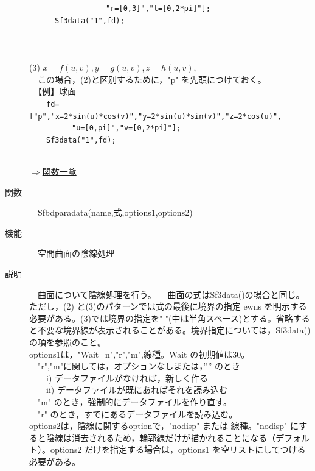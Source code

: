 \documentclass[papersize,a4paper,12pt,uplatex]{jsarticle}
\begin{document}
\begin{description}
　　　　　　　　　\verb|"r=[0,3]","t=[0,2*pi]"];|\\
　　　\verb|Sf3data("1",fd);|\\
\\
　　　\\
\\
(3) $x=f(u,v),y=g(u,v),z=h(u,v),$\\
　この場合，(2)と区別するために，"p" を先頭につけておく。\\
　【例】球面\\
　　\verb|fd=["p","x=2*sin(u)*cos(v)","y=2*sin(u)*sin(v)","z=2*cos(u)",|\\
　　　　　\verb|"u=[0,pi]","v=[0,2*pi]"];|\\
　　\verb|Sf3data("1",fd);|\\

　　　　　　\\

\begin{flushright} \hyperlink{functionlist3d}{$\Rightarrow$関数一覧}\end{flushright}

\hypertarget{sfbdparadata}{}
\item[関数]　Sfbdparadata(name,式,options1,options2)
\item[機能]　空間曲面の陰線処理
\item[説明]　曲面について陰線処理を行う。
　曲面の式はSf3data()の場合と同じ。ただし，(2) と(3)のパターンでは式の最後に境界の指定 ewns を明示する必要がある。(3)では境界の指定を" "(中は半角スペース)とする。省略すると不要な境界線が表示されることがある。境界指定については，Sf3data()の項を参照のこと。\\
options1は，"Wait=n","r","m",線種。Wait の初期値は30。\\
　"r","m"に関しては，オプションなしまたは，”” のとき\\
　　i) データファイルがなければ，新しく作る\\
　　ii) データファイルが既にあればそれを読み込む\\
　"m"  のとき，強制的にデータファイルを作り直す。\\
　"r" のとき，すでにあるデータファイルを読み込む。\\ 
options2は，陰線に関するoptionで，"nodisp" または 線種。"nodisp" にすると陰線は消去されるため，輪郭線だけが描かれることになる（デフォルト）。options2 だけを指定する場合は，options1 を空リストにしてつける必要がある。\\


\end{description}
\end{document}
